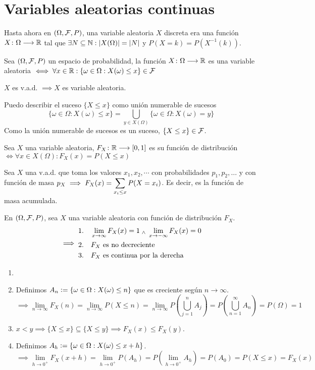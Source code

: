 \section{Variables aleatorias continuas}
Hasta ahora en $(\Omega, \mathcal{F}, P)$, una variable aleatoria $X$ discreta era una función $X \colon \Omega \longrightarrow \mathbb{R}$ tal que $\exists N \subseteq \mathbb{N} : \left|X(\Omega)\right|=\left|N\right|$ y $P(X=k)=P(X^{-1}(k))$.
\begin{defn}
	Sea $(\Omega, \mathcal{F}, P)$ un espacio de probabilidad, la función $X \colon \Omega \longrightarrow \mathbb{R}$ es una variable aleatoria $\iff \forall x \in \mathbb{R} : \{\omega\in\Omega : X(\omega) \leq x\} \in \mathcal{F}$
\end{defn}
\begin{prop}
	$X$ es v.a.d. $\implies X$ es variable aleatoria.
	\begin{dem}
		Puedo describir el suceso $\{X\leq x\}$ como unión numerable de sucesos
		\[\{\omega \in\Omega : X(\omega) \leq x\} = \bigcup_{y\in X(\Omega)} \{\omega \in \Omega : X(\omega) = y\}\]
		Como la unión numerable de sucesos es un suceso, $\{X\leq x\} \in \mathcal{F}$.
	\end{dem}
\end{prop}
\begin{defn}
	Sea $X$ una variable aleatoria, $F_X \colon \mathbb{R} \longrightarrow [0,1]$ es su función de distribución $\iff \forall x \in X(\Omega) : \boxed{F_X(x) = P(X\leq x)}$
\end{defn}
Sea $X$ una v.a.d. que toma los valores $x_1, x_2, \cdots$ con probabilidades $p_1, p_2, \dots$ y con función de masa $p_X \displaystyle \implies F_X(x) = \sum_{x_i \leq x} P(X=x_i)$. Es decir, es la función de masa acumulada.
\begin{lem}
	En $(\Omega, \mathcal{F}, P)$, sea $X$ una variable aleatoria con función de distribución $F_X$.
	\[\implies \begin{aligned}
			1. \quad & \lim_{x\to\infty} F_X(x) = 1 \; _{\wedge} \; \lim_{x\to-\infty} F_X(x) = 0 \\
			2. \quad & F_X \text{ es no decreciente}                                  \\
			3. \quad & F_X \text{ es continua por la derecha}
		\end{aligned}\]
	\begin{dem}
		\begin{enumerate}[topsep=1pt, itemsep=1pt,parsep=3pt] \item[]
			\item Definimos $A_n \vcentcolon= \{\omega \in \Omega : X(\omega) \leq n\}$ que es creciente según $n\to \infty$.
			      \[\implies \lim_{n\to\infty} F_X(n) = \lim_{n\to\infty} P(X\leq n) = \lim_{n\to\infty} P\left(\bigcup_{j=1}^n A_j\right) = P\left(\bigcup_{n=1}^\infty A_n\right) = P(\Omega) = 1\]
			\item $x<y \implies \{X\leq x\} \subseteq \{X\leq y\} \implies F_X(x) \leq F_X(y)$.
			\item Definimos $A_h \vcentcolon= \{\omega \in \Omega : X(\omega) \leq x + h\}$.
			      \[\implies \lim_{h\to 0^+} F_X(x+h) = \lim_{h\to 0^+} P\left(A_h\right) = P\left(\lim_{h\to 0^+} A_h\right) = P(A_0) = P(X \leq x) = F_X(x)\]
		\end{enumerate}
	\end{dem}
\end{lem}
